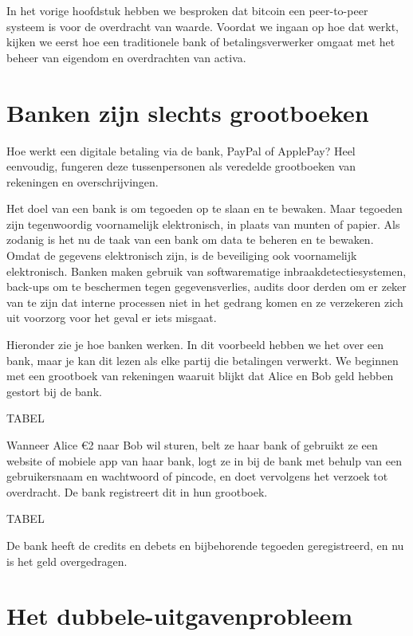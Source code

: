 \documentclass[
  letterpaper,
]{scrbook}
\begin{document}
In het vorige hoofdstuk hebben we besproken dat bitcoin een peer-to-peer
systeem is voor de overdracht van waarde. Voordat we ingaan op hoe dat
werkt, kijken we eerst hoe een traditionele bank of betalingsverwerker
omgaat met het beheer van eigendom en overdrachten van activa.

\hypertarget{banken-zijn-slechts-grootboeken}{%
\section{Banken zijn slechts
grootboeken}\label{banken-zijn-slechts-grootboeken}}

Hoe werkt een digitale betaling via de bank, PayPal of ApplePay? Heel
eenvoudig, fungeren deze tussenpersonen als veredelde grootboeken van
rekeningen en overschrijvingen.

Het doel van een bank is om tegoeden op te slaan en te bewaken. Maar
tegoeden zijn tegenwoordig voornamelijk elektronisch, in plaats van
munten of papier. Als zodanig is het nu de taak van een bank om data te
beheren en te bewaken. Omdat de gegevens elektronisch zijn, is de
beveiliging ook voornamelijk elektronisch. Banken maken gebruik van
softwarematige inbraakdetectiesystemen, back-ups om te beschermen tegen
gegevensverlies, audits door derden om er zeker van te zijn dat interne
processen niet in het gedrang komen en ze verzekeren zich uit voorzorg
voor het geval er iets misgaat.

Hieronder zie je hoe banken werken. In dit voorbeeld hebben we het over
een bank, maar je kan dit lezen als elke partij die betalingen verwerkt.
We beginnen met een grootboek van rekeningen waaruit blijkt dat Alice en
Bob geld hebben gestort bij de bank.

TABEL

Wanneer Alice €2 naar Bob wil sturen, belt ze haar bank of gebruikt ze
een website of mobiele app van haar bank, logt ze in bij de bank met
behulp van een gebruikersnaam en wachtwoord of pincode, en doet
vervolgens het verzoek tot overdracht. De bank registreert dit in hun
grootboek.

TABEL

De bank heeft de credits en debets en bijbehorende tegoeden
geregistreerd, en nu is het geld overgedragen.

\hypertarget{het-dubbele-uitgavenprobleem}{%
\section{Het
dubbele-uitgavenprobleem}\label{het-dubbele-uitgavenprobleem}}
\end{document}
